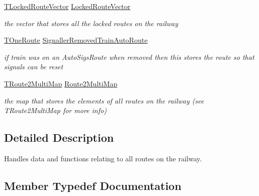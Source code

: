 \begin{DoxyCompactItemize}
\mbox{\label{class_t_all_routes_ac714cf25fa52dcf055f1feb449e751e2}} 
\mbox{\hyperlink{class_t_all_routes_a00c2d57382ed6560f1c611bdfddc3a6f}{T\+Locked\+Route\+Vector}} \mbox{\hyperlink{class_t_all_routes_ac714cf25fa52dcf055f1feb449e751e2}{Locked\+Route\+Vector}}
\begin{DoxyCompactList}\small\item\em the vector that stores all the locked routes on the railway \end{DoxyCompactList}\item 
\mbox{\label{class_t_all_routes_a747ff868fb8db132732b282b1c30f35b}} 
\mbox{\hyperlink{class_t_one_route}{T\+One\+Route}} \mbox{\hyperlink{class_t_all_routes_a747ff868fb8db132732b282b1c30f35b}{Signaller\+Removed\+Train\+Auto\+Route}}
\begin{DoxyCompactList}\small\item\em if train was on an Auto\+Sigs\+Route when removed then this stores the route so that signals can be reset \end{DoxyCompactList}\item 
\mbox{\label{class_t_all_routes_a5dc6dfad729cb6659fb1cceafe00aa79}} 
\mbox{\hyperlink{class_t_all_routes_a1d2aa3032df6e13d1f6f1a93f96157c6}{T\+Route2\+Multi\+Map}} \mbox{\hyperlink{class_t_all_routes_a5dc6dfad729cb6659fb1cceafe00aa79}{Route2\+Multi\+Map}}
\begin{DoxyCompactList}\small\item\em the map that stores the elements of all routes on the railway (see T\+Route2\+Multi\+Map for more info) \end{DoxyCompactList}\end{DoxyCompactItemize}


\subsection{Detailed Description}
Handles data and functions relating to all routes on the railway. 

\subsection{Member Typedef Documentation}
\mbox{\label{class_t_all_routes_a1d2aa3032df6e13d1f6f1a93f96157c6}} 
